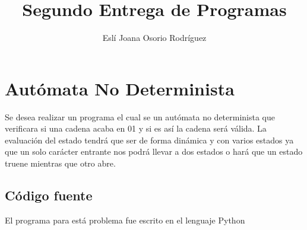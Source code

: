 \documentclass[12pt]{article}
\title{Segundo Entrega de Programas}
\author{Eslí Joana Osorio Rodríguez}
\begin{document}
\maketitle

\newpage

\tableofcontents

\newpage

\section{Autómata No Determinista}
Se desea realizar un programa el cual se un autómata no determinista que verificara si una cadena acaba en 01 y si es así la cadena será válida. La evaluación del estado tendrá que ser de forma dinámica y con varios estados ya que un solo carácter entrante nos podrá llevar a dos estados o hará que un estado truene mientras que otro abre.
 \cite{automatas}

\subsection{Código fuente}
El programa para está problema fue escrito en el lenguaje Python\\
\end{document}
